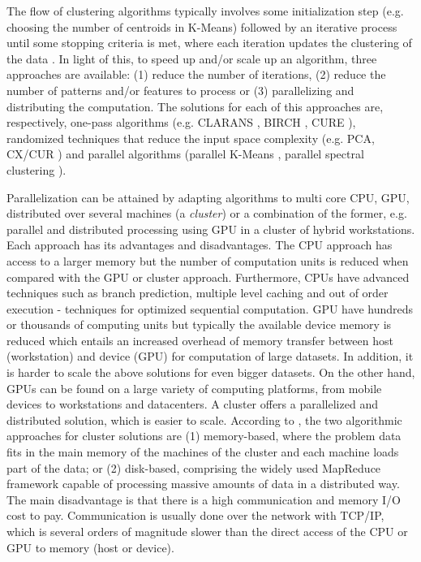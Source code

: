The flow of clustering algorithms typically involves some initialization step (e.g. choosing the number of centroids in K-Means) followed by an iterative process until some stopping criteria is met, where each iteration updates the clustering of the data \cite{Aggarwal2014}.
In light of this, to speed up and/or scale up an algorithm, three approaches are available: (1) reduce the number of iterations, (2) reduce the number of patterns and/or features to process or (3) parallelizing and distributing the computation.
The solutions for each of this approaches are, respectively, one-pass algorithms (e.g. CLARANS \cite{ng2002clarans}, BIRCH \cite{zhang1996birch}, CURE \cite{guha1998cure}), randomized techniques that reduce the input space complexity (e.g. PCA, CX/CUR \cite{drineas2006fast}) and parallel algorithms (parallel K-Means \cite{Zechner2009b}, parallel spectral clustering \cite{chen2011parallel}).


Parallelization can be attained by adapting algorithms to multi core CPU, GPU, distributed over several machines (a \emph{cluster}) or a combination of the former, e.g. parallel and distributed processing using GPU in a cluster of hybrid workstations.
Each approach has its advantages and disadvantages.
The CPU approach has access to a larger memory but the number of computation units is reduced when compared with the GPU or cluster approach.
Furthermore, CPUs have advanced techniques such as branch prediction, multiple level caching and out of order execution - techniques for optimized sequential computation.
GPU have hundreds or thousands of computing units but typically the available device memory is reduced which entails an increased overhead of memory transfer between host (workstation) and device (GPU) for computation of large datasets.
In addition, it is harder to scale the above solutions for even bigger datasets.
On the other hand, GPUs can be found on a large variety of computing platforms, from mobile devices to workstations and datacenters.
A cluster offers a parallelized and distributed solution, which is easier to scale.
According to \cite{Aggarwal2014}, the two algorithmic approaches for cluster solutions are (1) memory-based, where the problem data fits in the main memory of the machines of the cluster and each machine loads part of the data; or (2) disk-based, comprising the widely used MapReduce framework capable of processing massive amounts of data in a distributed way.
The main disadvantage is that there is a high communication and memory I/O cost to pay.
Communication is usually done over the network with TCP/IP, which is several orders of magnitude slower than the direct access of the CPU or GPU to memory (host or device).

